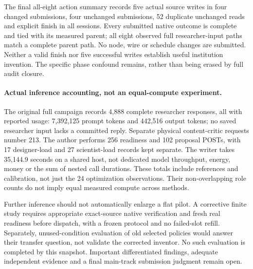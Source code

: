 The final all-eight action summary records five actual source writes in four
changed submissions, four unchanged submissions, 52 duplicate unchanged reads
and explicit finish in all sessions. Every submitted native outcome is complete
and tied with its measured parent; all eight observed full researcher-input
paths match a complete parent path. No node, wire or schedule changes are
submitted. Neither a valid finish nor five successful writes establish useful
institution invention. The specific phase confound remains, rather than being
erased by full audit closure.

\paragraph{Actual inference accounting, not an equal-compute experiment.}
The original full campaign records 4,888 complete researcher responses, all
with reported usage: 7,392,125 prompt tokens and 442,516 output tokens; no saved
researcher input lacks a committed reply. Separate physical content-critic
requests number 213. The author performs 256 readiness and 102 proposal POSTs,
with 17 designer-load and 27 scientist-load records kept separate. The writer
takes 35,144.9 seconds on a shared host, not dedicated model throughput, energy,
money or the sum of nested call durations. These totals include references and
calibration, not just the 24 optimization observations. Their non-overlapping
role counts do not imply equal measured compute across methods.

Further inference should not automatically enlarge a flat pilot. A corrective finite study
requires appropriate exact-source native verification and fresh real readiness
before dispatch, with a frozen protocol and no failed-slot refill. Separately,
unused-condition evaluation of old selected policies would answer their transfer
question, not validate the corrected inventor. No such evaluation is completed
by this snapshot. Important differentiated findings, adequate independent
evidence and a final main-track submission judgment remain open.

